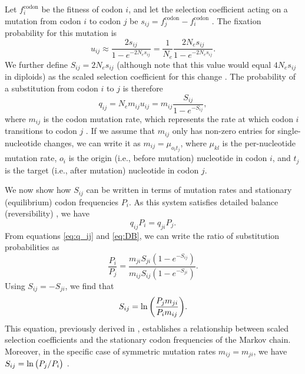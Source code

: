 \documentclass[11pt]{article}
\begin{document}
Let $f^\text{codon}_i$ be the fitness of codon $i$, and let the selection coefficient acting on a mutation from codon $i$ to codon $j$ be $s_{ij} = f^\text{codon}_j - f^\text{codon}_i$ \citep{SellaHirsh2005,YangNielsen2008}. The fixation probability for this mutation is \citep{Kimura1962,HalpernBruno1998,YangNielsen2008}
\begin{equation}\label{eq:u_ij}
u_{ij} \approx \frac{2s_{ij}}{1 - e^{-2N_es_{ij}}} = \frac{1}{N_e}\frac{2N_es_{ij}}{1 - e^{-2N_es_{ij}}} .
\end{equation}
We further define $S_{ij} = 2N_es_{ij}$ (although note that this value would equal $4N_es_{ij}$ in diploids) as the scaled selection coefficient for this change \citep{YangNielsen2008}. The probability of a substitution from codon $i$ to $j$ is therefore
\begin{equation}\label{eq:q_ij}
q_{ij} = N_em_{ij}u_{ij} = m_{ij}\frac{S_{ij}}{1 - e^{-S_{ij}}} , 
\end{equation} where $m_{ij}$ is the codon mutation rate, which represents the rate at which codon $i$ transitions to codon $j$  \citep{HalpernBruno1998,SellaHirsh2005}. If we assume that $m_{ij}$ only has non-zero entries for  single-nucleotide changes, we can write it as $m_{ij}=\mu_{o_it_j}$, where $\mu_{kl}$ is the per-nucleotide mutation rate, $o_i$ is the origin (i.e., before mutation) nucleotide in codon $i$, and $t_j$ is the target (i.e., after mutation) nucleotide in codon $j$.

We now show how $S_{ij}$ can be written in terms of mutation rates and stationary (equilibrium) codon frequencies $P_i$. As this system satisfies detailed balance (reversibility) \citep{HalpernBruno1998}, we have 
\begin{equation}\label{eq:DB}
q_{ij}P_i = q_{ji}P_j .
\end{equation} From equations \eqref{eq:q_ij} and \eqref{eq:DB}, we can write the ratio of substitution probabilities as 
\begin{equation}\label{ratio_q_ij}
\frac{P_i}{P_j} = \frac{m_{ji} S_{ji} (1-e^{-S_{ij}})} {m_{ij} S_{ij} (1-e^{-S_{ji}})} .
\end{equation} Using $S_{ij} = -S_{ji}$, we find that
\begin{equation}\label{eq:s_pmu}
S_{ij} = \ln\bigg{(} \frac{P_jm_{ji}}{P_im_{ij}} \bigg{)} .
\end{equation} This equation, previously derived in \citet{HalpernBruno1998}, establishes a relationship between scaled selection coefficients and the stationary codon frequencies of the Markov chain. Moreover, in the specific case of symmetric mutation rates $m_{ij} = m_{ji}$, we have $S_{ij} = \ln\big{(}P_j/P_i\big{)}$ \citep{SellaHirsh2005}. 
\end{document}
